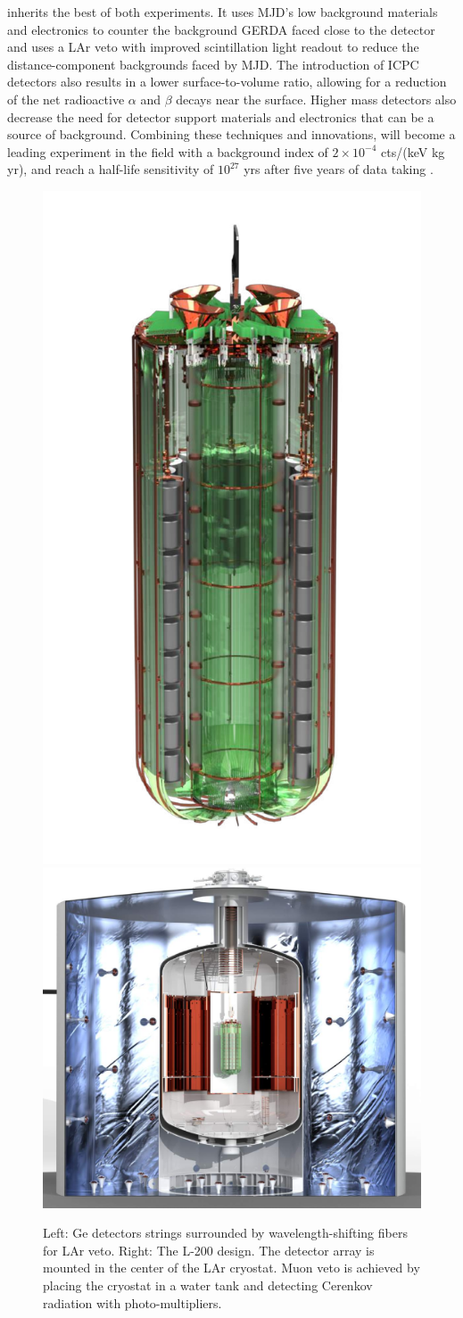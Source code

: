 {\Ltwo} inherits the best of both experiments. It uses MJD's low background materials and electronics to counter the background GERDA faced close to the detector and uses a LAr veto with improved scintillation light readout to reduce the distance-component backgrounds faced by MJD. The introduction of ICPC detectors also results in a lower surface-to-volume ratio, allowing for a reduction of the net radioactive $\alpha$ and $\beta$ decays near the surface. Higher mass detectors also decrease the need for detector support materials and electronics that can be a source of background. Combining these techniques and innovations, {\Ltwo} will become a leading experiment in the field with a background index of $2 \times 10^{-4}$ cts/(keV kg yr), and reach a half-life sensitivity of $10^{27}$ yrs after five years of data taking \cite{l1000_pcdr}.
\begin{figure}[t]
 \centering

  \includegraphics[trim=0 1cm 0 0,clip,height=0.4\linewidth]{ch2/figs/l200_strings.pdf}
\qquad
  \includegraphics[height=0.4\linewidth]{ch2/figs/l200_fig.pdf}
 \caption{\label{fig:L200} Left: {\Ltwo} Ge detectors strings
 surrounded by wavelength-shifting fibers for LAr veto. Right: The L-200 design. The detector array is mounted in the center of the LAr cryostat. Muon veto is achieved by placing the cryostat in a water tank and detecting Cerenkov radiation with photo-multipliers. %
}
\end{figure}

